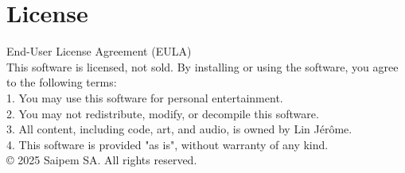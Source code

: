 \documentclass{article}
\begin{document}
\newpage
\section{License}
End-User License Agreement (EULA)\\
\newline
\noindent This software is licensed, not sold. By installing or using the software, you agree to the following terms:\\
1. You may use this software for personal entertainment.\\
2. You may not redistribute, modify, or decompile this software.\\
3. All content, including code, art, and audio, is owned by Lin Jérôme.\\
4. This software is provided "as is", without warranty of any kind.\\
\newline
\noindent © 2025 Saipem SA. All rights reserved.
\end{document}
